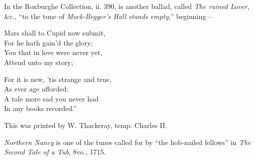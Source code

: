 In the Roxburghe Collection, ii. 390, is another ballad, called \textit{The ruined
Lover}, \&c., “to the tune of \textit{Mock-Begger's Hall stands empty},” beginning—
\settowidth{\versewidth}{Mars shall to Cupid now submit,}
\begin{dcverse}
\begin{altverse}
Mars shall to Cupid now submit,\\
For he hath gain’d the glory;\\
You that in love were never yet,\\
Attend unto my story;
\end{altverse}

\begin{altverse}
For it is new, ’tis strange and true,\\
As ever age afforded;\\
A tale more sad you never had\\
In any books recorded.”
\end{altverse}
\end{dcverse}

This was printed by W. Thackeray, temp. Charles II.

\textit{Northern Nancy} is one of the tunes called for by “the hob-nailed fellows” in
\textit{The Second Tale of a Tub}, 8vo., 1715.



\pagebreak


